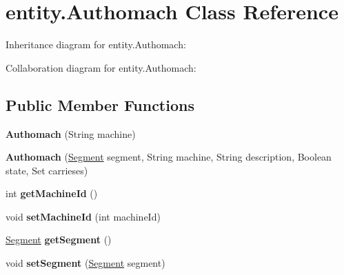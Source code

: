 \hypertarget{classentity_1_1_authomach}{}\section{entity.\+Authomach Class Reference}
\label{classentity_1_1_authomach}


Inheritance diagram for entity.\+Authomach\+:


Collaboration diagram for entity.\+Authomach\+:
\subsection*{Public Member Functions}
\begin{DoxyCompactItemize}
\item 
\mbox{\label{classentity_1_1_authomach_a1eb6c92d1956ca8b0c3b293a8dbbdf4a}} 
{\bfseries Authomach} (String machine)
\item 
\mbox{\label{classentity_1_1_authomach_af3425c30f37e29a33a803369b86cdb52}} 
{\bfseries Authomach} (\mbox{\hyperlink{classentity_1_1_segment}{Segment}} segment, String machine, String description, Boolean state, Set carrieses)
\item 
\mbox{\label{classentity_1_1_authomach_aa123815d3d8c471756c298edba10d4e1}} 
int {\bfseries get\+Machine\+Id} ()
\item 
\mbox{\label{classentity_1_1_authomach_aa7eb52c9c1828f6870b84727cb2fd7d9}} 
void {\bfseries set\+Machine\+Id} (int machine\+Id)
\item 
\mbox{\label{classentity_1_1_authomach_a08e3637e3072ae69547c55c136bf0d1e}} 
\mbox{\hyperlink{classentity_1_1_segment}{Segment}} {\bfseries get\+Segment} ()
\item 
\mbox{\label{classentity_1_1_authomach_a75b5743fea612c7915a59ad0c4ec7bba}} 
void {\bfseries set\+Segment} (\mbox{\hyperlink{classentity_1_1_segment}{Segment}} segment)
\item 
\mbox{\label{classentity_1_1_authomach_a08ead7b4a71cc2e05277d2f21e78643c}} 

\end{DoxyCompactItemize}
